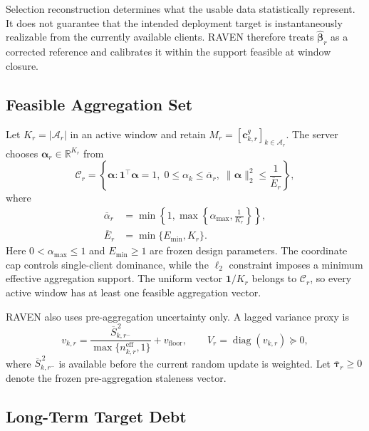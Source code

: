 \documentclass[letterpaper,journal]{IEEEtran}
\begin{document}
Selection reconstruction determines what the usable data statistically
represent.  It does not guarantee that the intended deployment target is
instantaneously realizable from the currently available clients.  RAVEN
therefore treats $\widehat{\boldsymbol\beta}_r$ as a corrected reference and
calibrates it within the support feasible at window closure.

\subsection{Feasible Aggregation Set}
\label{subsec:feasible_set}

Let $K_r=|\mathcal{A}_r|$ in an active window and retain
$M_r=[\mathbf{c}^{g}_{k,r}]_{k\in\mathcal{A}_r}$.  The server chooses
$\boldsymbol\alpha_r\in\mathbb{R}^{K_r}$ from
\begin{equation}
 \mathcal{C}_r
 =
 \left\{
 \boldsymbol\alpha:
 \mathbf{1}^{\top}\boldsymbol\alpha=1,\;
 0\le\alpha_k\le\overline\alpha_r,\;
 \|\boldsymbol\alpha\|_2^2\le\frac{1}{\overline E_r}
 \right\},
 \label{eq:Cr}
\end{equation}
where
\begin{equation}
\begin{aligned}
 \overline\alpha_r
 &=
 \min\!\left\{
 1,
 \max\!\left\{
 \alpha_{\max},
 \frac{1}{K_r}
 \right\}
 \right\},\\
 \overline E_r
 &=
 \min\{E_{\min},K_r\}.
\end{aligned}
 \label{eq:cap_ess}
\end{equation}
Here $0<\alpha_{\max}\le1$ and $E_{\min}\ge1$ are frozen design parameters.
The coordinate cap controls single-client dominance, while the
$\ell_2$ constraint imposes a minimum effective aggregation support.  The
uniform vector $\mathbf{1}/K_r$ belongs to $\mathcal{C}_r$, so every active
window has at least one feasible aggregation vector.

RAVEN also uses pre-aggregation uncertainty only.  A lagged variance proxy is
\begin{equation}
 v_{k,r}
 =
 \frac{
 \overline S_{k,r^-}^{\,2}
 }{
 \max\{n^{\mathrm{eff}}_{k,r},1\}
 }
 +
 v_{\mathrm{floor}},
 \qquad
 V_r=\operatorname{diag}(v_{k,r})\succeq0,
 \label{eq:variance_proxy}
\end{equation}
where $\overline S_{k,r^-}^{\,2}$ is available before the current random update
is weighted.  Let $\overline{\boldsymbol\tau}_r\ge0$ denote the frozen
pre-aggregation staleness vector.

\subsection{Long-Term Target Debt}
\label{subsec:debt}
\end{document}
